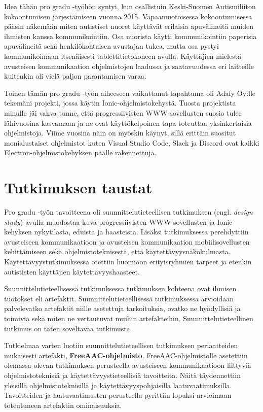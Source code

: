 \documentclass[utf8]{gradu3}
\begin{document}
Idea tähän pro gradu -työhön syntyi, kun osallistuin Keski-Suomen Autismiliiton kokoontumisen järjestämiseen vuonna 2015. Vapaamuotoisessa kokoontumisessa pääsin näkemään miten autistiset nuoret käyttävät erilaisia apuvälineitä muiden ihmisten kanssa kommunikointiin. Osa nuorista käytti kommunikointiin paperisia apuvälineitä sekä henkilökohtaisen avustajan tukea, mutta osa pystyi kommunikoimaan itsenäisesti tablettitietokoneen avulla. Käyttäjien mielestä avusteisen kommunikaation ohjelmistojen laadussa ja saatavuudessa eri laitteille kuitenkin oli vielä paljon parantamisen varaa.

Toinen tämän pro gradu -työn aiheeseen vaikuttanut tapahtuma oli Adafy Oy:lle tekemäni projekti, jossa käytin Ionic-ohjelmistokehystä. Tuosta projektista minulle jäi vahva tunne, että progressiivisten WWW-sovellusten suosio tulee lähivuosina kasvamaan ja ne ovat käyttökelpoinen tapa toteuttaa yksinkertaisia ohjelmistoja. Viime vuosina näin on myöskin käynyt, sillä erittäin suositut monialustaiset ohjelmistot kuten Visual Studio Code, Slack ja Discord ovat kaikki Electron-ohjelmistokehyksen päälle rakennettuja.

\chapter{Tutkimuksen taustat}

Pro gradu -työn tavoitteena oli suunnittelutieteellisen tutkimuksen (engl. \textit{design study}) avulla muodostaa kuva progressiivisten WWW-sovellusten ja Ionic-kehyksen nykytilasta, eduista ja haasteista. Lisäksi tutkimuksessa perehdyttiin avusteiseen kommunikaatioon ja avusteisen kommunikaation mobiilisovellusten kehittämiseen sekä ohjelmistoteknisestä, että käytettävyysnäkökulmasta. Käytettävyystutkimuksessa otettiin huomioon erityisryhmien tarpeet ja etenkin autististen käyttäjien käytettävyyshaasteet.

Suunnittelutieteellisessä tutkimuksessa tutkimuksen kohteena ovat ihmisen tuotokset eli artefaktit. Suunnittelutieteellisessä tutkimuksessa arvioidaan palvelevatko artefaktit niille asetettuja tarkoituksia, ovatko ne hyödyllisiä ja toimivia sekä miten ne vertautuvat muihin artefakteihin. Suunnittelutieteellinen tutkimus on täten soveltavaa tutkimusta.

Tutkielmaa varten luotiin suunnittelutieteellisen tutkimuksen periaatteiden mukaisesti artefakti, \textbf{FreeAAC-ohjelmisto}. FreeAAC-ohjelmistolle asetettiin olemassa olevan tutkimuksen perusteella avusteiseen kommunikaatioon liittyviä ohjelmistoteknisiä ja käytettävyystieteellisiä tavoitteita. Näitä täydennettiin yleisillä ohjelmistoteknisillä ja käytettävyyspohjaisilla laatuvaatimuksilla. Tavoitteiden ja laatuvaatimusten perusteella pyrittiin lopuksi arvioimaan toteutuneen artefaktin ominaisuuksia.
\end{document}
